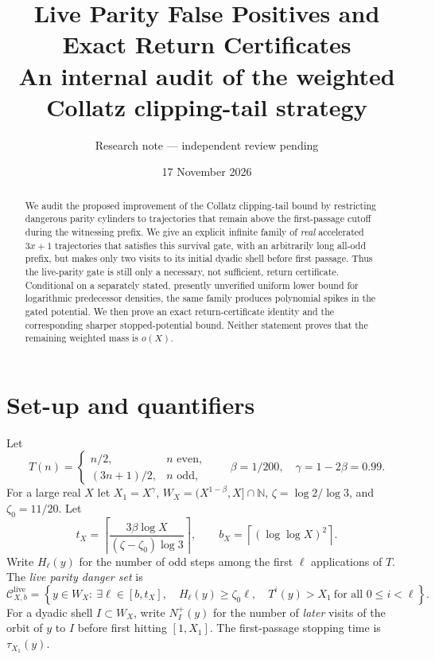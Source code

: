 \documentclass[11pt,a4paper]{article}
\title{Live Parity False Positives and Exact Return Certificates\\
\large An internal audit of the weighted Collatz clipping-tail strategy}
\author{Research note --- independent review pending}
\date{17 November 2026}
\newcommand{\N}{\mathbb N}
\newcommand{\calC}{\mathcal C}
\begin{document}
\maketitle
\begin{abstract}
We audit the proposed improvement of the Collatz clipping-tail bound by
restricting dangerous parity cylinders to trajectories that remain above the
first-passage cutoff during the witnessing prefix.  We give an explicit
infinite family of \emph{real} accelerated $3x+1$ trajectories that satisfies
this survival gate, with an arbitrarily long all-odd prefix, but makes only
two visits to its initial dyadic shell before first passage. Thus the
live-parity gate is still only a necessary, not sufficient, return certificate.
Conditional on a separately stated, presently unverified uniform lower bound
for logarithmic predecessor densities, the same family produces polynomial
spikes in the gated potential.  We then prove an exact return-certificate
identity and the corresponding sharper stopped-potential bound.  Neither
statement proves that the remaining weighted mass is $o(X)$.
\end{abstract}

\section{Set-up and quantifiers}
Let
\[
T(n)=\begin{cases}n/2,&n\text{ even},\\(3n+1)/2,&n\text{ odd},\end{cases}
\qquad \beta=1/200,\quad \gamma=1-2\beta=0.99.
\]
For a large real $X$ let $X_1=X^\gamma$, $W_X=(X^{1-\beta},X]\cap\N$,
$\zeta=\log 2/\log3$, and $\zeta_0=11/20$. Let
\[
 t_X=\left\lceil\frac{3\beta\log X}{(\zeta-\zeta_0)\log3}\right\rceil,
\qquad b_X=\left\lceil(\log\log X)^2\right\rceil.
\]
Write $H_\ell(y)$ for the number of odd steps among the first $\ell$
applications of $T$. The \emph{live parity danger set} is
\[
\calC^{\mathrm{live}}_{X,b}
=\left\{y\in W_X:\ \exists\ell\in[b,t_X],\quad
H_\ell(y)\ge\zeta_0\ell,\quad
T^i(y)>X_1\ \text{for all }0\le i<\ell\right\}.
\]
For a dyadic shell $I\subset W_X$, write $N_I^+(y)$ for the
number of \emph{later} visits of the orbit of $y$ to $I$ before first
hitting $[1,X_1]$. The first-passage stopping time is $\tau_{X_1}(y)$.
\end{document}
